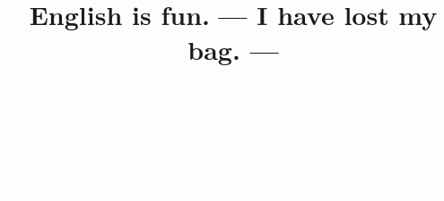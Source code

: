 \documentclass[aspectratio=169,xcolor={dvipsnames,table}]{beamer}
\title{English is fun.\,\,{}--- I have lost my bag. ---}
\author{}
\institute[]{}
\date[]
\makeatletter
\newcommand*{\themonth}{\two@digits\month}
\newcommand*{\theday}{\two@digits\day}
\newcommand{\mytoday}{{\the\year}--{\themonth}--{\theday}}
\makeatother
\begin{document}
\begin{frame}
\raggedleft
  \textcolor{white}{\Huge\bfseries English is fun.}

\vfill

\raggedleft
 \textcolor{white}{\LARGE\bfseries \mytoday}

\vfill
\vfill
\vfill

\raggedleft
\textcolor{white}{\large The lesson will begin at the scheduled time.}

\end{frame}
\end{document}
